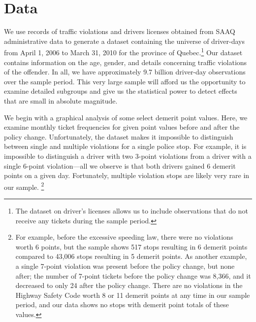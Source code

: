 \section{Data}
\label{sec:Data}


We use records of traffic violations and drivers licenses obtained 
from SAAQ administrative data to generate a dataset containing 
the universe of driver-days from April 1, 2006 to March 31, 2010 
for the province of Quebec.\footnote{%
The dataset on driver’s licenses allows us to include observations 
that do not receive any tickets during the sample period.}  
Our dataset contains information on the age, gender, 
and details concerning traffic violations of the offender. 
In all, we have approximately 9.7 billion driver-day observations 
over the sample period. 
This very large sample will afford us the opportunity to examine 
detailed subgroups and give us the statistical power 
to detect effects that are small in absolute magnitude.

We begin with a graphical analysis of some select demerit point values. 
Here, we examine monthly ticket frequencies for given point values 
before and after the policy change. 
Unfortunately, the dataset makes it impossible to distinguish 
between single and multiple violations for a single police stop. 
For example, it is impossible to distinguish a driver 
with two 3-point violations from a driver 
with a single 6-point violation---all we observe is that 
both drivers gained 6 demerit points on a given day. 
Fortunately, multiple violation stops are likely very rare in our sample.%
\footnote{%
For example, before the excessive speeding law, 
there were no violations worth 6 points, 
but the sample shows 517 stops resulting in 6 demerit points 
compared to 43,006 stops resulting in 5 demerit points. 
As another example, a single 7-point violation was present 
before the policy change, but none after; 
the number of 7-point tickets before the policy change was 8,366, 
and it decreased to only 24 after the policy change. 
There are no violations in the Highway Safety Code worth 8 or 11 demerit points 
at any time in our sample period, 
and our data shows no stops with demerit point totals of these values.}

